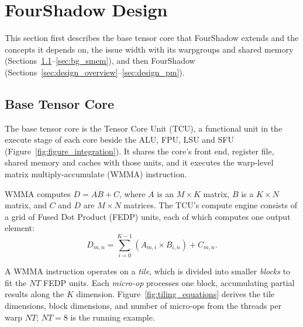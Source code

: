 \section{FourShadow Design}
\label{sec:design}

This section first describes the base tensor core that FourShadow extends and the concepts it depends on, the issue width with its warpgroups and shared memory (Sections~\ref{sec:bg_tcu}--\ref{sec:bg_smem}), and then FourShadow (Sections~\ref{sec:design_overview}--\ref{sec:design_pm}).

\subsection{Base Tensor Core}
\label{sec:bg_tcu}


The base tensor core is the Tensor Core Unit (TCU), a functional unit in the execute stage of each core beside the ALU, FPU, LSU and SFU (Figure~\ref{fig:figure_integration}). It shares the core's front end, register file, shared memory and caches with those units, and it executes the warp-level matrix multiply-accumulate (WMMA) instruction.

WMMA computes $D = AB + C$, where $A$ is an $M{\times}K$ matrix, $B$ is a $K{\times}N$ matrix, and $C$ and $D$ are $M{\times}N$ matrices. The TCU's compute engine consists of a grid of Fused Dot Product (FEDP) units, each of which computes one output element:
\begin{equation}
\label{eq:fedp}
D_{m,n} =
\sum_{i=0}^{K-1}
\left(A_{m,i} \times B_{i,n}\right) + C_{m,n}.
\end{equation}



A WMMA instruction operates on a \emph{tile}, which is divided into smaller \emph{blocks} to fit the $\mathit{NT}$ FEDP units. Each \emph{micro-op} processes one block, accumulating partial results along the $K$ dimension.
Figure~\ref{fig:tiling_equations} derives the tile dimensions, block dimensions, and number of micro-ops from the threads per warp $\mathit{NT}$; $\mathit{NT}{=}8$ is the running example.


